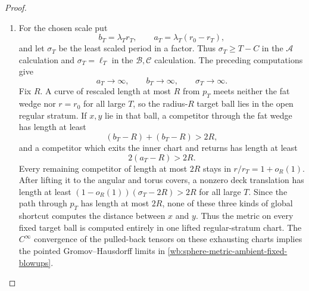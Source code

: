 \begin{proof}
\begin{enumerate}[label=\arabic*.,leftmargin=*]
\item For the chosen scale put
\[
 b_T=\lambda_Tr_T,\qquad a_T=\lambda_T(r_0-r_T),
\]
and let \(\sigma_T\) be the least scaled period in a factor.  Thus
\(\sigma_T\geq T-C\) in the \(\mathcal A\) calculation and
\(\sigma_T=\ell_T\) in the \(\mathcal B,\mathcal C\) calculation.  The
preceding computations give
\[
 a_T\longrightarrow\infty,\qquad
 b_T\longrightarrow\infty,\qquad
 \sigma_T\longrightarrow\infty.
\]
Fix \(R\).  A curve of rescaled length at most \(R\) from \(p_T\) meets
neither the fat wedge nor \(r=r_0\) for all large \(T\), so the
radius-\(R\) target ball lies in the open regular stratum.  If \(x,y\) lie
in that ball, a competitor through the fat wedge has length at least
\[
 (b_T-R)+(b_T-R)>2R,
\]
and a competitor which exits the inner chart and returns has length at
least
\[
 2(a_T-R)>2R.
\]
Every remaining competitor of length at most \(2R\) stays in
\(r/r_T=1+o_R(1)\).  After lifting it to the angular and torus covers, a
nonzero deck translation has length at least
\((1-o_R(1))(\sigma_T-2R)>2R\) for all large \(T\).  Since the path through
\(p_T\) has length at most \(2R\), none of these three kinds of global
shortcut computes the distance between \(x\) and \(y\).  Thus the metric
on every fixed target ball is computed entirely in one lifted
regular-stratum chart.  The \(C^\infty\) convergence of the pulled-back
tensors on these exhausting charts implies the pointed
Gromov--Hausdorff limits in
\eqref{wb:sphere-metric-ambient-fixed-blowups}.
\end{enumerate}
\end{proof}

